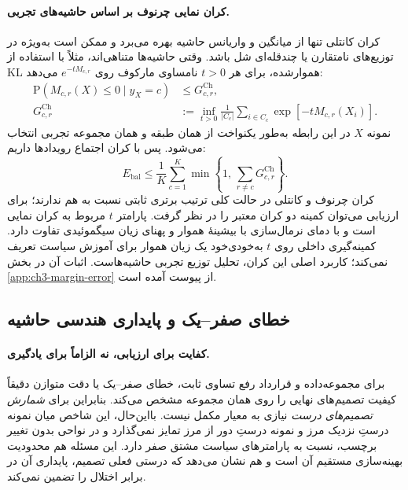 \paragraph{کران نمایی چرنوف بر اساس حاشیه‌های تجربی.}
کران کانتلی تنها از میانگین و
واریانس حاشیه بهره می‌برد و ممکن
است به‌ویژه در توزیع‌های نامتقارن
یا چندقله‌ای شل باشد. وقتی
حاشیه‌ها متناهی‌اند، مثلاً با
استفاده از KL هموارشده،
برای هر $t>0$ نامساوی مارکوف
\cite{BoucheronLugosiMassart2013}
روی $e^{-tM_{c,r}}$ می‌دهد:
\begin{equation}\label{cmp:eq:ch3-margin-Chernoff}
\boxed{
\begin{aligned}
\mathrm P(M_{c,r}(X)\le0\mid y_X=c)
&\le G_{c,r}^{\mathrm{Ch}},\\
G_{c,r}^{\mathrm{Ch}}
&:=\inf_{t>0}
\frac1{|C_c|}\sum_{i\in C_c}
\exp[-t M_{c,r}(X_i)].
\end{aligned}
}
\end{equation}
نمونه $X$ در این رابطه
به‌طور یکنواخت از همان طبقه
و همان مجموعه تجربی انتخاب می‌شود.
پس با کران اجتماع رویدادها داریم:
\begin{equation}\label{cmp:eq:ch3-margin-Chernoff-balanced}
\boxed{
E_{\mathrm{bal}}\le
\frac1K\sum_{c=1}^{K}
\min\!\left\{1,\,
\sum_{r\ne c}G_{c,r}^{\mathrm{Ch}}\right\}.
}
\end{equation}
کران چرنوف و کانتلی
در حالت کلی ترتیب برتری
ثابتی نسبت به هم ندارند؛
برای ارزیابی می‌توان کمینه
دو کران معتبر را در نظر گرفت.
پارامتر $t$ مربوط به کران
نمایی است و با دمای نرمال‌سازی با بیشینهٔ هموار
و پهنای زیان سیگموئیدی
تفاوت دارد. کمینه‌گیری
داخلی روی $t$ به‌خودی‌خود
یک زیان هموار برای آموزش
سیاست تعریف نمی‌کند؛
کاربرد اصلی این کران،
تحلیل توزیع تجربی حاشیه‌هاست.
اثبات آن در بخش
\ref{app:ch3-margin-error}
از پیوست آمده است.



\subsection{خطای صفر--یک و پایداری هندسی حاشیه}
\label{cmp:subsec:ch3-margin-robustness}

\paragraph{کفایت برای ارزیابی، نه الزاماً برای یادگیری.}
برای مجموعه‌داده و قرارداد رفع تساوی ثابت،
خطای صفر--یک یا دقت متوازن دقیقاً
کیفیت تصمیم‌های نهایی را روی همان مجموعه مشخص می‌کند.
بنابراین برای \emph{شمارش تصمیم‌های درست} نیازی
به معیار مکمل نیست. بااین‌حال، این شاخص میان
نمونه درستِ نزدیک مرز و نمونه درستِ دور از مرز
تمایز نمی‌گذارد و در نواحی بدون تغییر برچسب،
نسبت به پارامترهای سیاست مشتق صفر دارد.
این مسئله هم محدودیت بهینه‌سازی مستقیم آن است
و هم نشان می‌دهد که درستی فعلی تصمیم،
پایداری آن در برابر اختلال را تضمین نمی‌کند.

